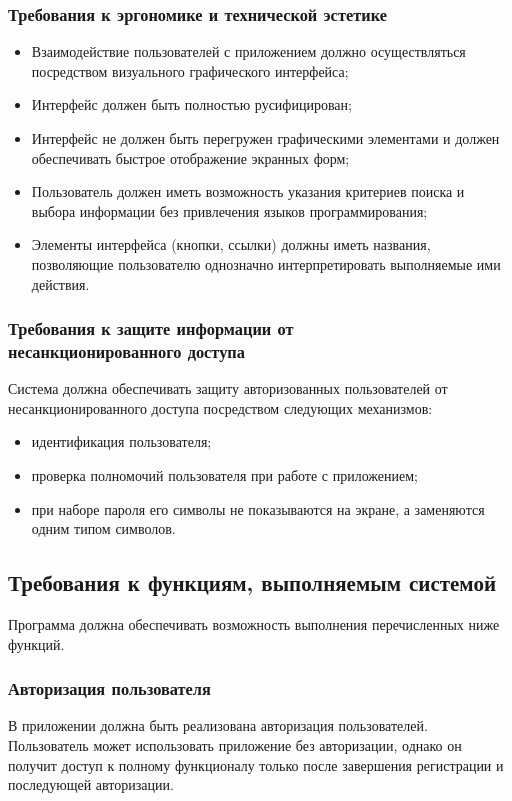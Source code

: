 \documentclass[14pt]{extreport}
\begin{document}
\subsubsection{Требования к эргономике и технической эстетике}
\begin{itemize}
	\item Взаимодействие пользователей с приложением должно осуществляться посредством визуального графического интерфейса;
	\item Интерфейс должен быть полностью русифицирован;
	\item Интерфейс не должен быть перегружен графическими элементами и должен обеспечивать быстрое отображение экранных форм;
	\item Пользователь должен иметь возможность указания критериев поиска и выбора информации без привлечения языков программирования;
	\item Элементы интерфейса (кнопки, ссылки) должны иметь названия, позволяющие пользователю однозначно интерпретировать выполняемые 
ими действия.
\end{itemize}

\subsubsection{Требования к защите информации от \\ несанкционированного доступа}
Система должна обеспечивать защиту авторизованных пользователей от несанкционированного доступа посредством следующих механизмов:
\begin{itemize}
	\item идентификация пользователя;
	\item проверка полномочий пользователя при работе с приложением;
	\item при наборе пароля его символы не показываются на экране, а заменяются одним типом символов.
\end{itemize}

\subsection{Требования к функциям, выполняемым системой}
Программа должна обеспечивать возможность выполнения перечисленных ниже
функций.

\subsubsection{Авторизация пользователя}
В приложении должна быть реализована авторизация пользователей. Пользователь может использовать приложение без авторизации, однако он получит доступ к полному функционалу только после завершения регистрации и последующей авторизации.
\end{document}
